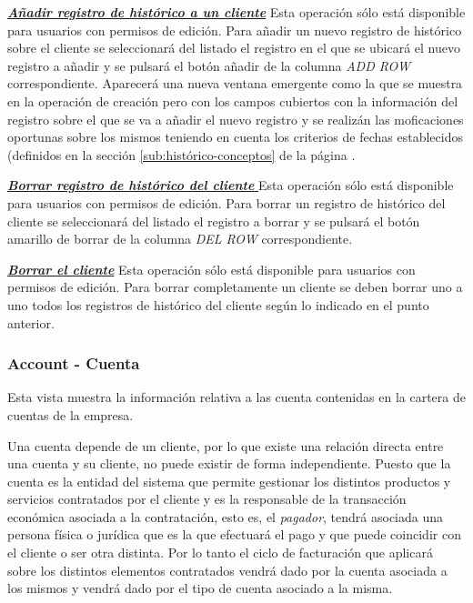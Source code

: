 \underline{\textsl{\textbf{Añadir registro de histórico a un cliente}}}\newline
Esta operación sólo está disponible para usuarios con permisos de edición.
Para añadir un nuevo registro de histórico sobre el cliente se seleccionará del listado el registro en el que se ubicará el nuevo registro a añadir y se pulsará el botón añadir de la columna \textit{ADD ROW} correspondiente. Aparecerá una nueva ventana emergente como la que se muestra en la operación de creación pero con los campos cubiertos con la información del registro sobre el que se va a añadir el nuevo registro y se realizán las moficaciones oportunas sobre los mismos teniendo en cuenta los criterios de fechas establecidos (definidos en la sección \ref{sub:histórico-conceptos} de la página \pageref{sub:histórico-conceptos}.


\underline{\textsl{\textbf{Borrar registro de histórico del cliente }}}\newline
Esta operación sólo está disponible para usuarios con permisos de edición.
Para borrar un registro de histórico del cliente se seleccionará del listado el registro a borrar y se pulsará el botón amarillo de borrar de la columna \textit{DEL ROW} correspondiente.\newline

\underline{\textsl{\textbf{Borrar el cliente}}}\newline
Esta operación sólo está disponible para usuarios con permisos de edición.
Para borrar completamente un cliente se deben borrar uno a uno todos los registros de histórico del cliente según lo indicado en el punto anterior. 





\subsubsection{Account - Cuenta}
\label{sub:account}

Esta vista muestra la información relativa a las cuenta contenidas en la cartera de cuentas de la empresa.

Una cuenta depende de un cliente, por lo que existe una relación directa entre una cuenta y su cliente, no puede existir de forma independiente. Puesto que la cuenta es la entidad del sistema que permite gestionar los distintos productos y servicios contratados por el cliente y es la responsable de la transacción económica asociada a la contratación, esto es, el \textit{pagador}, tendrá asociada una persona física o jurídica que es la que efectuará el pago y que puede coincidir con el cliente o ser otra distinta. Por lo tanto el ciclo de facturación que aplicará sobre los distintos elementos contratados vendrá dado por la cuenta asociada a los mismos y vendrá dado por el tipo de cuenta asociado a la misma.


